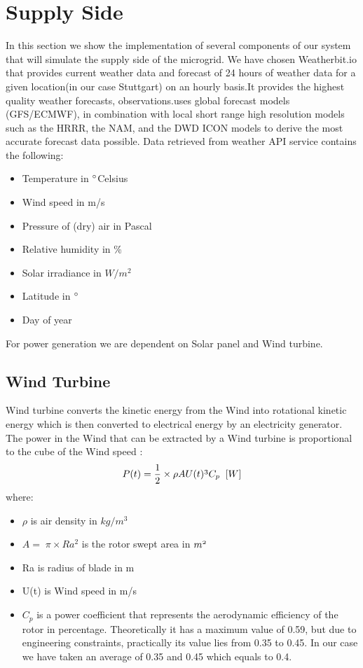 \documentclass[runningheads]{llncs}
\begin{document}
\section{Supply Side}
In this section we show the implementation of several components of our system that will simulate the supply side of the microgrid. We  have chosen Weatherbit.io that provides current weather data and forecast of  24 hours of weather data for a given location(in our case Stuttgart) on an hourly basis.It provides the highest quality weather forecasts, observations.uses global forecast models (GFS/ECMWF), in combination with local short range high resolution models such as the HRRR, the NAM, and the DWD ICON models to derive the most accurate forecast data possible. Data retrieved from weather API\cite{Weatherbit.io} service contains the following:

\begin{itemize}
\item Temperature in $\degree$Celsius 
\item Wind speed in m/s
\item Pressure of (dry) air in  Pascal
\item Relative humidity in \%
\item Solar irradiance in $W/m^2$
\item Latitude in $\degree$
\item Day of year
\end{itemize}

For power generation we are dependent on Solar panel and Wind turbine.\\
\subsection{Wind Turbine}
Wind turbine converts the kinetic energy from the Wind into rotational kinetic energy which is then converted to electrical energy by an electricity generator. The power in the Wind that can be extracted by a Wind turbine is proportional to the cube of the Wind speed :\cite{Ilche}\\
\[P(t)= \frac{1}{2} \times \rho A \mathnormal{U(t)^3}C_p \;\;[W]\] 
\newline
where:
\begin{itemize}
\item $\rho$ is air density in $kg/{m^3}$
\item $A=\; \pi \times Ra^2$ is the rotor swept area in $\mathnormal{m^2}$
\item Ra is radius of blade in m
\item U(t) is Wind speed in m/s
\item $C_{p}$ is a power coefficient that represents the aerodynamic efficiency of the rotor in percentage. Theoretically it has a maximum value of 0.59, but due to engineering constraints, practically its value lies from 0.35 to 0.45. In our case we have taken  an average of 0.35 and 0.45 which equals to 0.4.\\
\end{itemize}
\end{document}
